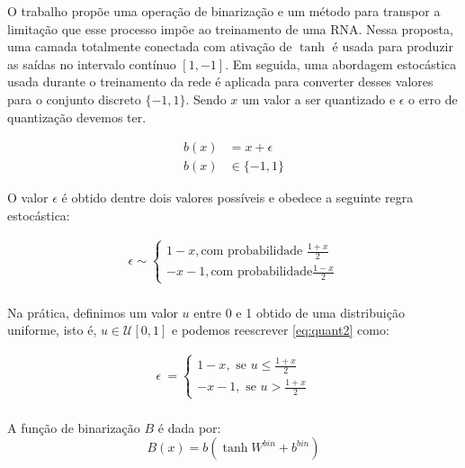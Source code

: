 O trabalho \cite{Variable2016Toderici} propõe uma operação de binarização e um método para transpor a limitação que esse processo impõe ao treinamento de uma RNA. 
Nessa proposta, uma camada totalmente conectada com ativação de $\tanh$ é usada para produzir as saídas no intervalo contínuo $[1,-1]$. Em seguida, uma abordagem estocástica usada durante o treinamento da rede é aplicada para converter desses valores para o conjunto discreto $\{- 1, 1\}$. Sendo $x$ um valor a ser quantizado e $\epsilon$ o erro de quantização devemos ter.

\begin{equation}
\begin{aligned}
b(x) &= x + \epsilon  \\
b(x) & \in \{-1, 1\}
\end{aligned}
\end{equation}

O valor $\epsilon$ é obtido dentre dois valores possíveis e obedece a seguinte regra estocástica:

\begin{equation}
\label{eq:quant2}
\begin{aligned}
\epsilon \sim \left\{
\begin{array}{ll}
1 - x, \text{com probabilidade } \frac{1 + x}{2} \\
-x - 1, \text{com probabilidade} \frac{1 - x}{2}
\end{array}
\right. \\
\end{aligned}
\end{equation}

Na prática, definimos um valor $u$ entre 0 e 1 obtido de uma distribuição uniforme, isto é,  $u \in \mathcal{U}[0,1]$ e podemos reescrever \ref{eq:quant2} como:

\begin{equation}
\label{eq:quant}
\begin{aligned}
\epsilon \ = \left\{
\begin{array}{ll}
1 - x, \text{ se $u$}  \leq \frac{1 + x}{2} \\
-x - 1, \text{ se $u$} > \frac{1 + x}{2}
\end{array}
\right. \\
\end{aligned}
\end{equation}


A função de binarização $B$ é dada por: 
\begin{equation}
B(x) = b(\tanh{W^{bin} + b^{bin}})
\end{equation}

